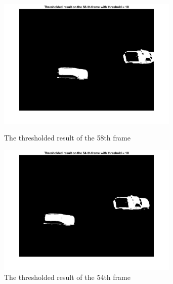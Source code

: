 \documentclass[a4paper]{article}
\begin{document}
\begin{spacing}{2.0}
\begin{enumerate}
	\begin{figure}[H]
	    \begin{minipage}[t]{0.5\textwidth}
	        \centering
	        \includegraphics[width=3.4in]{2_9.jpg}
	        \caption{The thresholded result of the 58th frame}
	        \label{fig:side:a}
	    \end{minipage}%
	  \begin{minipage}[t]{0.5\textwidth}
	      \centering
	      \includegraphics[width=3.4in]{2_10.jpg}
	      \caption{The thresholded result of the 54th frame}
	      \label{fig:side:b}
	    \end{minipage}
	\end{figure}
	
	\end{enumerate}
	
\end{spacing}
\end{document}

